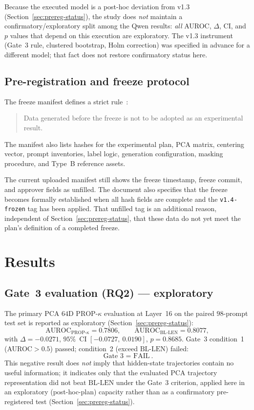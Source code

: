 \documentclass{article}
\newcommand{\auroc}{\mathrm{AUROC}}
\newcommand{\propk}{\mathrm{PROP}\text{-}\kappa}
\newcommand{\bllen}{\mathrm{BL\text{-}LEN}}
\begin{document}
Because the executed model is a post-hoc deviation from v1.3 (Section~\ref{sec:prereg-status}), the study does \emph{not} maintain a confirmatory/exploratory split among the {Qwen} results: \emph{all} {AUROC}, $\Delta$, {CI}, and $p$ values that depend on this execution are exploratory. The v1.3 instrument (Gate~3 rule, clustered bootstrap, {Holm} correction) was specified in advance for a different model; that fact does not restore confirmatory status here.

\subsection{Pre-registration and freeze protocol}
\label{sec:freeze}

The freeze manifest defines a strict rule~\citep{exptrj001freeze}:
\begin{quote}
Data generated before the freeze is not to be adopted as an experimental result.
\end{quote}
The manifest also lists hashes for the experimental plan, {PCA} matrix, centering vector, prompt inventories, label logic, generation configuration, masking procedure, and Type~B reference assets.

The current uploaded manifest still shows the freeze timestamp, freeze commit, and approver fields as unfilled. The document also specifies that the freeze becomes formally established when all hash fields are complete and the \texttt{v1.4-frozen} tag has been applied. That unfilled tag is an additional reason, independent of Section~\ref{sec:prereg-status}, that these data do not yet meet the plan's definition of a completed freeze.

\section{Results}
\label{sec:results}

\subsection{Gate~3 evaluation ({RQ2}) --- exploratory}
\label{sec:act1}

The primary {PCA} $64${D} $\propk$ evaluation at Layer~16 on the paired $98$-prompt test set is reported as exploratory (Section~\ref{sec:prereg-status}):
\begin{equation}
  \auroc_{\propk}=0.7806,
  \qquad
  \auroc_{\bllen}=0.8077,
\end{equation}
with $\Delta=-0.0271$, $95\%$~{CI} $[-0.0727,\ 0.0190]$, $p=0.8685$.
Gate~3 condition~1 ({AUROC}$>0.5$) passed; condition~2 (exceed $\bllen$) failed:
\begin{equation}
\boxed{\ \text{Gate 3 = FAIL}\ }.
\label{eq:gate3}
\end{equation}
This negative result does \emph{not} imply that hidden-state trajectories contain no useful information; it indicates only that the evaluated {PCA} trajectory representation did not beat $\bllen$ under the Gate~3 criterion, applied here in an exploratory (post-hoc-plan) capacity rather than as a confirmatory pre-registered test (Section~\ref{sec:prereg-status}).
\end{document}
